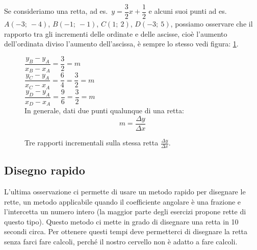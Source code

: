 Se consideriamo una retta, ad es.~\(y=\dfrac{3}{2}x +\dfrac{1}{2}\) e alcuni 
suoi punti ad es.~\(A(-3;~-4)\), \(B(-1;~-1)\), \(C(1;~2)\), \(D(-3;~5)\), 
possiamo osservare che il rapporto tra gli incrementi delle ordinate e delle 
ascisse, cioè l'aumento dell'ordinata diviso l'aumento dell'ascissa, è sempre 
lo stesso vedi figura: \ref{fig:rappincr}.

\begin{inaccessibleblock}
 \begin{figure}[h]
 \centering
 \begin{minipage}[]{.50\textwidth}
\(\dfrac{y_B - y_A}{x_B - x_A} = \dfrac{3}{2} = m\)\\

\(\dfrac{y_C - y_A}{x_C - x_A} = \dfrac{6}{4} = \dfrac{3}{2} = m\)\\

\(\dfrac{y_D - y_A}{x_D - x_A} = \dfrac{9}{6} = \dfrac{3}{2} = m\)\\

In generale, dati due punti qualunque di una retta:
\[m = \frac{\Delta y}{\Delta x}\]
 \end{minipage}
 \begin{minipage}[]{.40\textwidth}
   \centering \rappincr
 \end{minipage}
  \caption{Tre rapporti incrementali sulla stessa retta
  \(\frac{\Delta y}{\Delta x}\).}\label{fig:rappincr}
\end{figure}
\end{inaccessibleblock}


\subsection{Disegno rapido}

L'ultima osservazione ci permette di usare un metodo rapido per disegnare 
le rette, un metodo applicabile quando il coefficiente angolare è una 
frazione e l'intercetta un numero intero (la maggior parte degli esercizi 
propone rette di questo tipo). Questo metodo ci mette in grado di disegnare 
una retta in 10 secondi circa. Per ottenere questi tempi deve permetterci di 
disegnare la retta senza farci fare calcoli, perché il nostro cervello non è 
adatto a fare calcoli.

